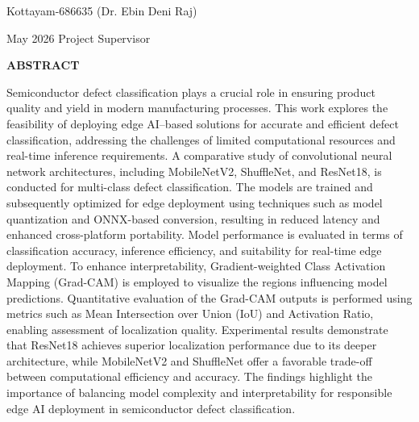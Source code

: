 \documentclass[12pt,a4wide]{report}
\theoremstyle{plain}
\theoremstyle{definition}
\theoremstyle{remark}
\begin{document}
\noindent Kottayam-686635  \hfill ({Dr. Ebin Deni Raj})

\noindent May 2026 \hfill Project Supervisor

\clearpage






\begin{center}
{\Large{\bf{ABSTRACT}}}
\end{center}


Semiconductor defect classification plays a crucial role in ensuring product quality and yield in modern manufacturing processes. This work explores the feasibility 
of deploying edge AI–based solutions for accurate and efficient defect classification, addressing the challenges of limited computational resources and real-time inference requirements. A comparative study of convolutional neural network architectures, including MobileNetV2, ShuffleNet, and ResNet18, is conducted for multi-class defect classification.
The models are trained and subsequently optimized for edge deployment using techniques such as model quantization and ONNX-based conversion, resulting in reduced latency and enhanced cross-platform portability. Model performance is evaluated in terms of classification accuracy, inference efficiency, and suitability for real-time edge deployment. To enhance interpretability, Gradient-weighted Class Activation Mapping (Grad-CAM) is employed to visualize the regions influencing model predictions. Quantitative evaluation of the Grad-CAM outputs is performed using metrics such as Mean Intersection over Union (IoU) and Activation Ratio, enabling assessment of localization quality. Experimental results demonstrate that ResNet18 achieves superior localization performance due to its deeper architecture, while MobileNetV2 and ShuffleNet offer a favorable trade-off between computational efficiency and accuracy. The findings highlight the importance of balancing model complexity and interpretability for responsible edge AI deployment in semiconductor defect classification.

\clearpage



\tableofcontents
\clearpage
\listoffigures
\listoftables


\newpage

\setcounter{page}{1}

\end{document}
